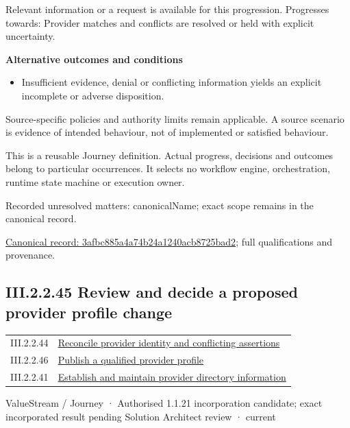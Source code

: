 Relevant information or a request is available for this progression. Progresses towards: Provider matches and conflicts are resolved or held with explicit uncertainty.



\par\medskip\textbf{Alternative outcomes and conditions}\par


\begin{itemize}


\item Insufficient evidence, denial or conflicting information yields an explicit incomplete or adverse disposition.

\end{itemize}


Source-specific policies and authority limits remain applicable. A source scenario is evidence of intended behaviour, not of implemented or satisfied behaviour.



This is a reusable Journey definition. Actual progress, decisions and outcomes belong to particular occurrences. It selects no workflow engine, orchestration, runtime state machine or execution owner.


{\small Recorded unresolved matters: canonicalName; exact scope remains in the canonical record.}\par
{\footnotesize \href{../../../../../../../continuum/strategy/value-stream/3afbc885a4a74b24a1240acb8725bad2.md}{Canonical record: 3afbc885a4a74b24a1240acb8725bad2}; full qualifications and provenance.}\par
\subsection*{III.2.2.45 Review and decide a proposed provider profile change}
\label{navigation:III.2.2.45}

\begin{longtable}{p{.22\linewidth}p{.73\linewidth}}
III.2.2.44 & \hyperref[element:3afbc885a4a74b24a1240acb8725bad2]{Reconcile provider identity and conflicting assertions} \\
III.2.2.46 & \hyperref[element:4522e0c4204e4c0c93d2b1f9ef3887ad]{Publish a qualified provider profile} \\
III.2.2.41 & \hyperref[element:679b0055ee5d42d4a838e35edd3de01f]{Establish and maintain provider directory information} \\
\end{longtable}
\label{element:d8e20e81429945caa1508b50956475b5}
{\small ValueStream / Journey · Authorised 1.1.21 incorporation candidate; exact incorporated result pending Solution Architect review · current}\par

